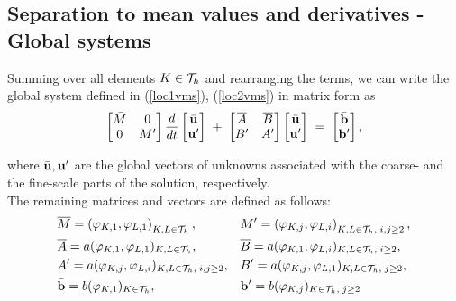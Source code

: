 \documentclass[mathserif]{beamer}
\begin{document}
\subsection{Separation to mean values and derivatives - Global systems}
\begin{frame}
Summing over all elements $K\in {\cal T}_h$ and rearranging the terms, 
we can write the global system defined in (\ref{loc1vms}), (\ref{loc2vms}) 
in matrix form as
\begin{eqnarray}
\vspace{-2mm}
\begin{bmatrix}
  \bar{M} & 0 \\  0 & M'
 \end{bmatrix} 
\frac d{d t}
\begin{bmatrix}
  \bar{\bu} \\  \bu'
 \end{bmatrix} 
\; + \;
\begin{bmatrix}
  \overline{A} & \overline{B} \\  B' & A'
 \end{bmatrix}
\begin{bmatrix}
  \bar{\bu} \\  \bu'
 \end{bmatrix}
\;=\;
\begin{bmatrix}
  \bar{\bb} \\  \bb'
 \end{bmatrix},
\vspace{-2mm}
\end{eqnarray}

where $\bar{\mathbf{u}}, \mathbf{u}'$ are the global vectors of unknowns associated with the coarse-
and the fine-scale parts of the solution, respectively.\ \\
The remaining matrices and vectors are defined as follows:
\vspace{-2mm}
\begin{align*}
&\overline{M} = \left(\varphi_{K, 1}, \varphi_{L, 1}\right)_{K, L \in {\cal T}_h},
&& M'=\left(\varphi_{K, j},  \varphi_{L, i}\right)_{K, L \in {\cal T}_h,\; i, j \ge 2},\\
&\overline{A} = a(\varphi_{K, 1}, \varphi_{L, 1})_{K, L \in {\cal T}_h}, 
&& \overline{B} = a(\varphi_{K, 1}, \varphi_{L, i})_{K, L \in {\cal T}_h,\; i \ge 2},\\
&A' = a(\varphi_{K, j},  \varphi_{L, i})_{K, L \in {\cal T}_h,\; i, j \ge 2},
&& B' = a(\varphi_{K, j}, \varphi_{L, 1})_{K, L \in {\cal T}_h,\; j \ge 2},\\
&\bar {\mathbf{b}} = b(\varphi_{K, 1})_{K \in {\cal T}_h},
&& \mathbf{b}' = b(\varphi_{K, j})_{K \in {\cal T}_h, \; j \ge 2}
\end{align*}


\end{frame}
\end{document}
